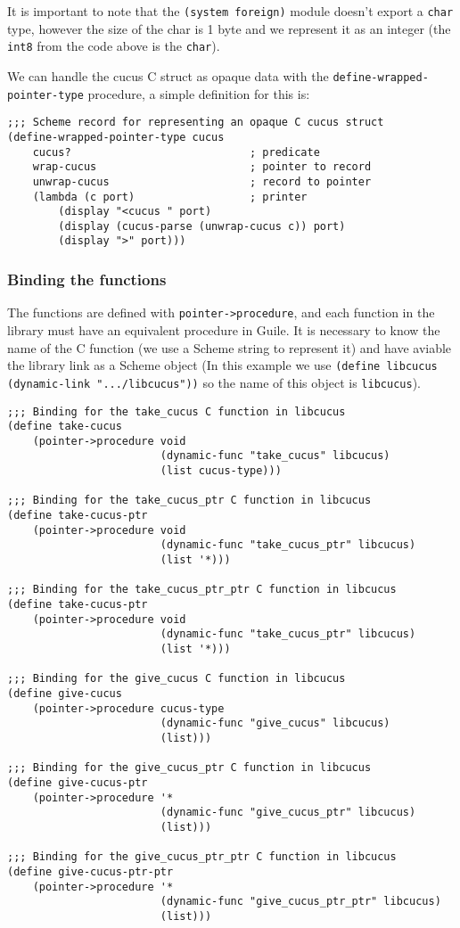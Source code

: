 \documentclass[latterpaper, leqno]{article}
\begin{document}
It is important to note that the \texttt{(system foreign)} module doesn't export a \texttt{char} type, however the size of the char is 1 byte and we represent it as an integer (the \texttt{int8} from the code above is the \texttt{char}).

We can handle the cucus C struct as opaque data with the \texttt{define-wrapped-pointer-type} procedure, a simple definition for this is:

\begin{verbatim}
;;; Scheme record for representing an opaque C cucus struct
(define-wrapped-pointer-type cucus
    cucus?                            ; predicate
    wrap-cucus                        ; pointer to record
    unwrap-cucus                      ; record to pointer
    (lambda (c port)                  ; printer
        (display "<cucus " port)
        (display (cucus-parse (unwrap-cucus c)) port)
        (display ">" port)))
\end{verbatim}

\subsubsection*{Binding the functions}
The functions are defined with \texttt{pointer->procedure}, and each function in the library must have an equivalent procedure in Guile. It is necessary to know the name of the C function (we use a Scheme string to represent it) and have aviable the library link as a Scheme object (In this example we use \texttt{(define libcucus (dynamic-link ".../libcucus"))} so the name of this object is \texttt{libcucus}).

\begin{verbatim}
;;; Binding for the take_cucus C function in libcucus
(define take-cucus
    (pointer->procedure void
                        (dynamic-func "take_cucus" libcucus)
                        (list cucus-type)))

;;; Binding for the take_cucus_ptr C function in libcucus
(define take-cucus-ptr
    (pointer->procedure void
                        (dynamic-func "take_cucus_ptr" libcucus)
                        (list '*)))

;;; Binding for the take_cucus_ptr_ptr C function in libcucus
(define take-cucus-ptr
    (pointer->procedure void
                        (dynamic-func "take_cucus_ptr" libcucus)
                        (list '*)))

;;; Binding for the give_cucus C function in libcucus
(define give-cucus
    (pointer->procedure cucus-type
                        (dynamic-func "give_cucus" libcucus)
                        (list)))

;;; Binding for the give_cucus_ptr C function in libcucus
(define give-cucus-ptr
    (pointer->procedure '*
                        (dynamic-func "give_cucus_ptr" libcucus)
                        (list)))

;;; Binding for the give_cucus_ptr_ptr C function in libcucus
(define give-cucus-ptr-ptr
    (pointer->procedure '*
                        (dynamic-func "give_cucus_ptr_ptr" libcucus)
                        (list)))
\end{verbatim}
\end{document}
